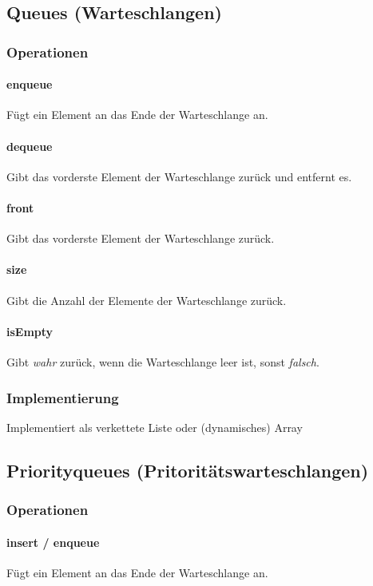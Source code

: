\subsection{Queues (Warteschlangen)}

\subsubsection{Operationen}
\paragraph{enqueue} Fügt ein Element an das Ende der Warteschlange an.
\paragraph{dequeue} Gibt das vorderste Element der Warteschlange zurück und entfernt es.
\paragraph{front} Gibt das vorderste Element der Warteschlange zurück.
\paragraph{size} Gibt die Anzahl der Elemente der Warteschlange zurück.
\paragraph{isEmpty} Gibt \textit{wahr} zurück, wenn die Warteschlange leer ist, sonst \textit{falsch}.

\subsubsection{Implementierung}
Implementiert als verkettete Liste oder (dynamisches) Array\\

\subsection{Priorityqueues (Pritoritätswarteschlangen)}
\label{subsec:Priorityqueues}

\subsubsection{Operationen}
\paragraph{insert / enqueue} Fügt ein Element an das Ende der Warteschlange an.
